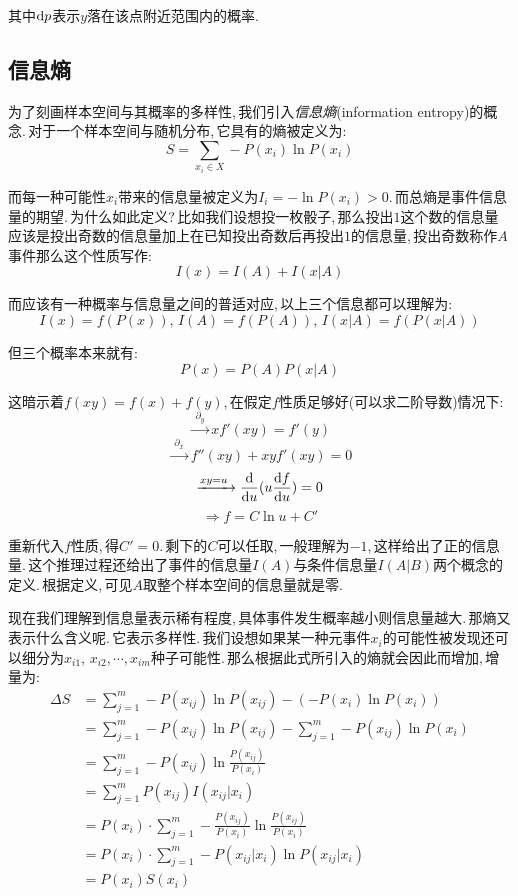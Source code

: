 其中\(\textrm{d} p\)表示\(y\)落在该点附近范围内的概率.

\subsection{信息熵}
为了刻画样本空间与其概率的多样性,\,我们引入\emph{信息熵}(information entropy)的概念.\,对于一个样本空间与随机分布,\,它具有的熵被定义为:
\[S=\sum_{x_i\in X}-P(x_i)\ln P(x_i)\]

而每一种可能性\(x_i\)带来的信息量被定义为\(I_i=-\ln P(x_i)>0\).\,而总熵是事件信息量的期望.\,为什么如此定义?\,比如我们设想投一枚骰子,\,那么投出\(1\)这个数的信息量应该是投出奇数的信息量加上在已知投出奇数后再投出\(1\)的信息量,\,投出奇数称作\(A\)事件那么这个性质写作:
\[I(x)=I(A)+I(x|A)\]

而应该有一种概率与信息量之间的普适对应,\,以上三个信息都可以理解为:
\[I(x)=f(P(x)),\,I(A)=f(P(A)),\,I(x|A)=f(P(x|A))\]

但三个概率本来就有:
\[P(x)=P(A)P(x|A)\]

这暗示着\(f(xy)=f(x)+f(y)\),\,在假定\(f\)性质足够好(可以求二阶导数)情况下:
\[\xrightarrow{\;\partial_y\;} xf'(xy)=f'(y)\]
\[\xrightarrow{\;\partial_x\;} f''(xy)+xyf'(xy)=0\]
\[\xrightarrow{xy=u\;} \frac{\textrm{d}}{\textrm{d} u}(u\frac{\textrm{d} f}{\textrm{d} u})=0\]
\[\Rightarrow f=C\ln u+C'\]

重新代入\(f\)性质,\,得\(C'=0\).\,剩下的\(C\)可以任取,\,一般理解为\(-1\),\,这样给出了正的信息量.\,这个推理过程还给出了事件的信息量\(I(A)\)与条件信息量\(I(A|B)\)两个概念的定义.\,根据定义,\,可见\(A\)取整个样本空间的信息量就是零.

现在我们理解到信息量表示稀有程度,\,具体事件发生概率越小则信息量越大.\,那熵又表示什么含义呢.\,它表示多样性.\,我们设想如果某一种元事件\(x_i\)的可能性被发现还可以细分为\(x_{i1},\,x_{i2},\cdots,x_{im}\)种子可能性.\,那么根据此式所引入的熵就会因此而增加,\,增量为:
\begin{align*}
\Delta S & = \sum_{j=1}^m -P(x_{ij})\ln P(x_{ij})-(-P(x_i)\ln P(x_i))\\
		 & = \sum_{j=1}^m -P(x_{ij})\ln P(x_{ij})-\sum_{j=1}^m -P(x_{ij})\ln P(x_i)\\
		 & = \sum_{j=1}^m -P(x_{ij})\ln\frac{P(x_{ij})}{P(x_i)}\\
		 & = \sum_{j=1}^m P(x_{ij})I(x_{ij}|x_i)\\
		 & = P(x_i)\cdot \sum_{j=1}^m -\frac{P(x_{ij})}{P(x_i)}\ln\frac{P(x_{ij})}{P(x_i)}\\
		 & = P(x_i)\cdot \sum_{j=1}^m -P(x_{ij}|x_i)\ln P(x_{ij}|x_i)\\
		 & = P(x_i) S(x_i)
\end{align*}

